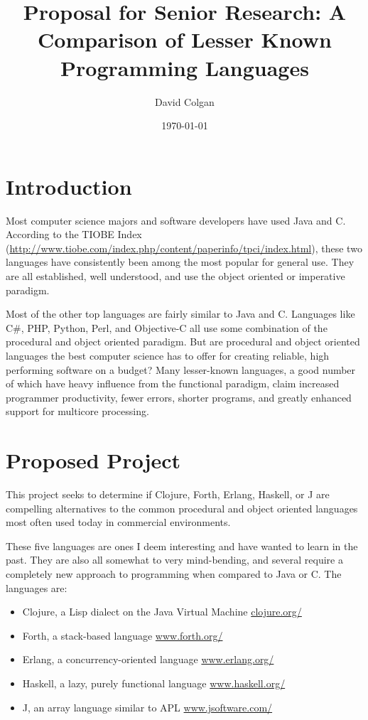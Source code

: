 \documentclass{article}
\title{Proposal for Senior Research: A Comparison of Lesser Known Programming
Languages}
\author{David Colgan}
\date{\today}
\begin{document}
\maketitle

\section{Introduction}

Most computer science majors and software developers have used Java and C.
According to the TIOBE Index
(\url{http://www.tiobe.com/index.php/content/paperinfo/tpci/index.html}), these
two languages have consistently been among the most popular for general use.
They are all established, well understood, and use the object oriented or
imperative paradigm.

Most of the other top languages are fairly similar to Java and C.  Languages
like C\#, PHP, Python, Perl, and Objective-C all use some combination of the
procedural and object oriented paradigm.   But are procedural and object
oriented languages the best computer science has to offer for creating reliable,
high performing software on a budget?  Many lesser-known languages, a good
number of which have heavy influence from the functional paradigm, claim
increased programmer productivity, fewer errors, shorter programs, and greatly
enhanced support for multicore processing.

\section{Proposed Project}

This project seeks to determine if Clojure, Forth, Erlang, Haskell, or J are
compelling alternatives to the common procedural and object oriented languages
most often used today in commercial environments.

These five languages are ones I deem interesting and have wanted to learn in
the past.  They are also all somewhat to very mind-bending, and several require
a completely new approach to programming when compared to Java or C.  The
languages are:

\begin{itemize}
\item Clojure, a Lisp dialect on the Java Virtual Machine
\url{clojure.org/}

\item Forth, a stack-based language
\url{www.forth.org/}

\item Erlang, a concurrency-oriented language
\url{www.erlang.org/}

\item Haskell, a lazy, purely functional language
\url{www.haskell.org/}

\item J, an array language similar to APL
\url{www.jsoftware.com/}
\end{itemize}
\end{document}
